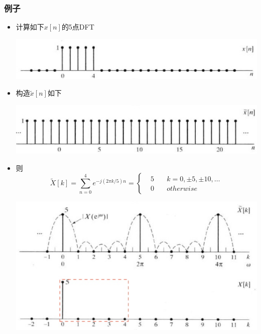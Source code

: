 \documentclass[CJKutf8,xcolor=pdftex,dvipsnames,table]{beamer}
\begin{document}
\begin{CJK*}{UTF8}{song}
  \begin{frame}
    \frametitle{例子}
    \begin{itemize}
	\item 计算如下$x[n]$的5点DFT
		\begin{center}
      	\includegraphics[scale=.25]{dtsp-c-f8-10a}
    	\end{center}
	\item 构造$\tilde{x}[n]$如下
		\begin{center}
      	\includegraphics[scale=.25]{dtsp-c-f8-10b}
    	\end{center}	
	\item 则
	\[
\tilde{X}[k] = \sum_{n=0}^{4} e^{-j(2\pi k/5)n} = 
\left\{
    \begin {aligned}
         & 5 \quad & k = 0, \pm5, \pm 10, \hdots \\
         & 0 \quad & otherwise
    \end{aligned}
\right.			
	\]
		\begin{center}
      	\includegraphics[scale=.28]{dtsp-c-f8-10cd}
    	\end{center}	
	\end{itemize}
  \end{frame}   
  

\end{CJK*}
\end{document}
